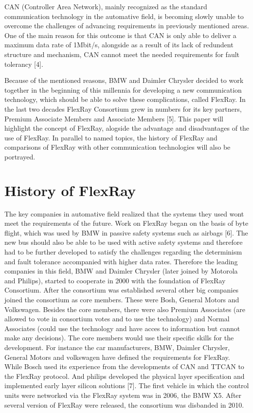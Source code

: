 \documentclass[conference]{IEEEtran}
\begin{document}
CAN (Controller Area Network), mainly recognized as the standard communication technology in the automative field, is becoming slowly unable to overcome the challenges of advancing requirements in previously mentioned areas. One of the main reason for this outcome is that CAN is only able to deliver a maximum data rate of 1Mbit/s, alongside as a result of its lack of redundent structure and mechanism, CAN cannot meet the needed requirements for fault tolerancy [4].

Because of the mentioned reasons, BMW and Daimler Chrysler decided to work together in the beginning of this millennia for developing a new communication technology, which should be able to solve these complications, called FlexRay. In the last two decades FlexRay Consortium grew in numbers for its key partners, Premium Associate Members and Associate Members [5]. This paper will highlight the concept of FlexRay, alogside the advantage and disadvantages of the use of FlexRay. In parallel to named topics, the history of FlexRay and comparisons of FlexRay with other communication technologies will also be portrayed.


\section{History of FlexRay}
The key companies in automative field realized that the systems they used wont meet the requirements of the future. Work on FlexRay began on the basis of byte flight, which was used by BMW in passive safety systems such as airbags [6]. The new bus should also be able to be used with active safety systems and therefore had to be further developed to satisfy the challenges regarding the determinism and fault tolerance accompanied with higher data rates. Therefore the leading companies in this field, BMW and Daimler Chrysler (later joined by Motorola and Philips), started to cooperate in 2000 with the foundation of FlexRay Consortium. After the consortium was established several other big companies joined the consortium as core members. These were Bosh, General Motors and Volkswagen. Besides the core members, there were also Premium Associates (are allowed to vote in consortium votes and to use the technology) and Normal Associates (could use the technology and have acces to information but cannot make any decisions). The core members would use their specific skills for the development. For instance the car manufacturers, BMW, Daimler Chrysler, General Motors and volkswagen have defined the requirements for FlexRay. While Bosch used its experience from the developments of CAN and TTCAN to the FlexRay protocol. And philips developed the physical layer specification and implemented early layer silicon solutions [7]. The first vehicle in which the control units were networked via the FlexRay system was in 2006, the BMW X5. After several version of FlexRay were released, the consortium was disbanded in 2010.
\end{document}
